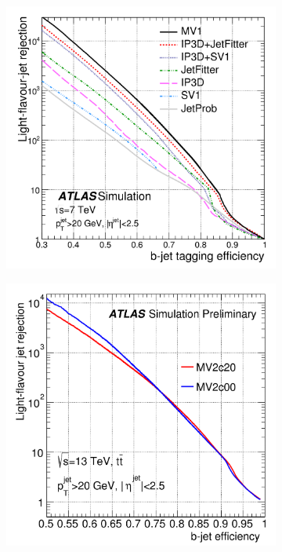 \begin{figure}[h!]
  \centering
  \captionsetup{justification=centering}

	\begin{subfigure}[t]{0.5\textwidth}
        \centering
        \includegraphics[width=\textwidth]{figures/MV1Perf}
        \caption{}
    \end{subfigure}%
    \begin{subfigure}[t]{0.5\textwidth}
        \centering
        \includegraphics[width=\textwidth]{figures/MV2Perf}
        \caption{}
    \end{subfigure}


\end{figure}
